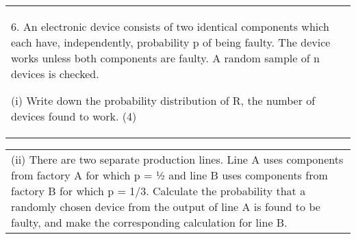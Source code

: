 \documentclass[a4paper,12pt]{article}
\begin{document}
  \begin{table}[ht!]
     \centering
     \begin{tabular}{|p{15cm}|}
     \hline
6. An electronic device consists of two identical components which each have, independently, probability p of being faulty.  The device works unless both components are faulty.  A random sample of n devices is checked. 
 
(i) Write down the probability distribution of R, the number of devices found to work. (4) 
 
 
 
 
 
      \end{tabular}
    \end{table}
    
    
  \begin{table}[ht!]
     \centering
     \begin{tabular}{|p{15cm}|}
     \hline
(ii) There are two separate production lines.  Line A uses components from factory A for which p = ½ and line B uses components from factory B for which p = 1/3.  Calculate the probability that a randomly chosen device from the output of line A is found to be faulty, and make the corresponding calculation for line B. 


      \end{tabular}
    \end{table}
\end{document}
